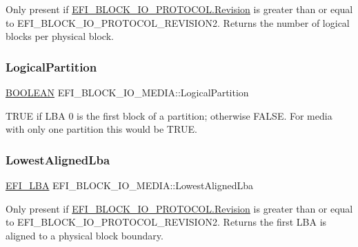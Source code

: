 Only present if \hyperlink{struct___e_f_i___b_l_o_c_k___i_o___p_r_o_t_o_c_o_l_a8ebcb5fbf96bc58b1c54e154e292c372}{E\+F\+I\+\_\+\+B\+L\+O\+C\+K\+\_\+\+I\+O\+\_\+\+P\+R\+O\+T\+O\+C\+O\+L.\+Revision} is greater than or equal to E\+F\+I\+\_\+\+B\+L\+O\+C\+K\+\_\+\+I\+O\+\_\+\+P\+R\+O\+T\+O\+C\+O\+L\+\_\+\+R\+E\+V\+I\+S\+I\+O\+N2. Returns the number of logical blocks per physical block. \mbox{\label{struct_e_f_i___b_l_o_c_k___i_o___m_e_d_i_a_a1d35f5bb70d1ca8ebe627474803faa3f}} 
\subsubsection{\texorpdfstring{Logical\+Partition}{LogicalPartition}}
{\footnotesize\ttfamily \hyperlink{_processor_bind_8h_a112e3146cb38b6ee95e64d85842e380a}{B\+O\+O\+L\+E\+AN} E\+F\+I\+\_\+\+B\+L\+O\+C\+K\+\_\+\+I\+O\+\_\+\+M\+E\+D\+I\+A\+::\+Logical\+Partition}

T\+R\+UE if L\+BA 0 is the first block of a partition; otherwise F\+A\+L\+SE. For media with only one partition this would be T\+R\+UE. \mbox{\label{struct_e_f_i___b_l_o_c_k___i_o___m_e_d_i_a_ae5aeaa551786c3bfda21f88f3f152943}} 
\subsubsection{\texorpdfstring{Lowest\+Aligned\+Lba}{LowestAlignedLba}}
{\footnotesize\ttfamily \hyperlink{_uefi_base_type_8h_a3495b0e526b2172f98d5bde00bf28b72}{E\+F\+I\+\_\+\+L\+BA} E\+F\+I\+\_\+\+B\+L\+O\+C\+K\+\_\+\+I\+O\+\_\+\+M\+E\+D\+I\+A\+::\+Lowest\+Aligned\+Lba}

Only present if \hyperlink{struct___e_f_i___b_l_o_c_k___i_o___p_r_o_t_o_c_o_l_a8ebcb5fbf96bc58b1c54e154e292c372}{E\+F\+I\+\_\+\+B\+L\+O\+C\+K\+\_\+\+I\+O\+\_\+\+P\+R\+O\+T\+O\+C\+O\+L.\+Revision} is greater than or equal to E\+F\+I\+\_\+\+B\+L\+O\+C\+K\+\_\+\+I\+O\+\_\+\+P\+R\+O\+T\+O\+C\+O\+L\+\_\+\+R\+E\+V\+I\+S\+I\+O\+N2. Returns the first L\+BA is aligned to a physical block boundary. \mbox{\label{struct_e_f_i___b_l_o_c_k___i_o___m_e_d_i_a_a7b5117f5bd52a4f81a8f6c4e0be6a039}} 

